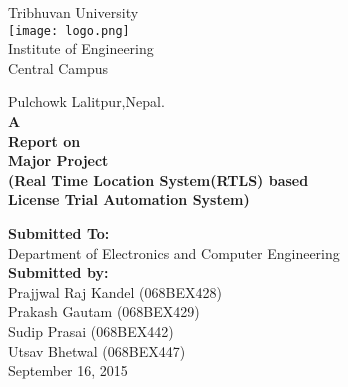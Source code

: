 \begin{titlepage}
	\begin{center}
		\begin{Huge}
			Tribhuvan University\\
			\texttt{[image: logo.png]}\\
			Institute of Engineering\\
			 Central Campus\\
		\end{Huge}
			Pulchowk Lalitpur,Nepal.\\
			\vfill
		\textbf{
					A\\
					Report on\\
					Major Project\\
					(Real Time Location System(RTLS) based\\
					License Trial Automation System)\\
				}
		\vfill

		\textbf{Submitted To:\\}
			Department of Electronics and Computer Engineering\\[2cm]
		\textbf{Submitted by:\\}
			Prajjwal Raj Kandel (068BEX428)\\
			Prakash Gautam (068BEX429)\\
			Sudip Prasai (068BEX442)\\
			Utsav Bhetwal (068BEX447)\\
			\vfill
            September 16, 2015
	\end{center}
\end{titlepage}
